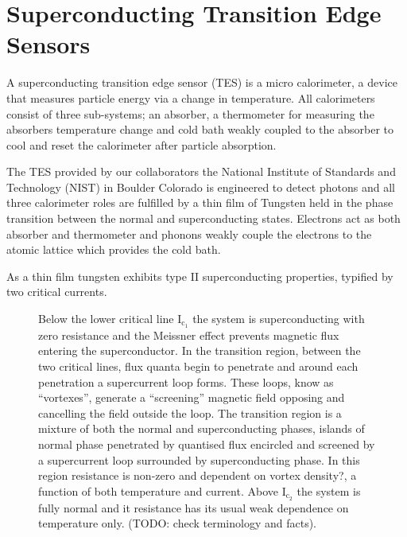 \documentclass{article}
\begin{document}



\section{Superconducting Transition Edge Sensors}
A superconducting transition edge sensor (TES) is a micro calorimeter, a device
that measures particle energy via a change in temperature. All calorimeters 
consist of three 
sub-systems; an absorber, a thermometer for measuring the absorbers 
temperature change and cold bath weakly coupled to the absorber to cool and 
reset the calorimeter after particle absorption. 

The TES provided by our collaborators the National Institute of Standards and
Technology (NIST) in Boulder Colorado \cite{Lita:08} is engineered to detect
photons and all three calorimeter roles are fulfilled by a thin film of Tungsten
held in the phase transition between the normal and superconducting states.
Electrons act as both absorber and thermometer and phonons weakly couple the
electrons to the atomic lattice which provides the cold bath.

As a thin film tungsten exhibits type II superconducting properties, typified
by two critical currents.

%   
%   
\begin{figure}[!hpbt]
  \centering
  
  \caption{
    Below the lower critical line $\mathrm{I}_{\mathrm{c}_{1}}$ the system is
    superconducting with zero resistance and the Meissner effect prevents
    magnetic flux entering the superconductor. In the transition region, between
    the two critical lines, flux quanta begin to penetrate and around each
    penetration a supercurrent loop forms. These loops, know as ``vortexes'', 
    generate a ``screening'' magnetic field opposing and cancelling the field 
    outside the loop. 
    The transition region is a mixture of both the normal and superconducting
    phases, islands of normal phase penetrated by quantised flux encircled and
    screened by a supercurrent loop surrounded by superconducting phase. In
    this region resistance is non-zero and dependent on vortex density?, a
    function of both temperature and current. Above $\mathrm{I}_{\mathrm{c}_2}$
    the system is fully normal and it resistance has its usual weak
    dependence on temperature only. (TODO: check terminology and facts).
    \label{fig:type2sc}
  }
\end{figure}
\end{document}
